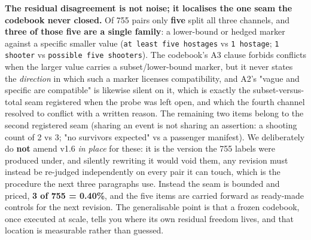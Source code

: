\textbf{The residual disagreement is not noise; it localises the one seam the codebook never closed.} Of 755 pairs only \textbf{five} split all three channels, and \textbf{three of those five are a single family}: a lower-bound or hedged marker against a specific smaller value (\texttt{at least five hostages} vs \texttt{1 hostage}; \texttt{1 shooter} vs \texttt{possible five shooters}). The codebook's A3 clause forbids conflicts when the larger value carries a subset/lower-bound marker, but it never states the \emph{direction} in which such a marker licenses compatibility, and A2's "vague and specific are compatible" is likewise silent on it, which is exactly the subset-versus-total seam registered when the probe was left open, and which the fourth channel resolved to conflict with a written reason. The remaining two items belong to the second registered seam (sharing an event is not sharing an assertion: a shooting count of 2 vs 3; "no survivors expected" vs a passenger manifest). We deliberately do \textbf{not} amend v1.6 \emph{in place} for these: it is the version the 755 labels were produced under, and silently rewriting it would void them, any revision must instead be re-judged independently on every pair it can touch, which is the procedure the next three paragraphs use. Instead the seam is bounded and priced, \textbf{3 of 755 = 0.40\%}, and the five items are carried forward as ready-made controls for the next revision. The generalisable point is that a frozen codebook, once executed at scale, tells you where its own residual freedom lives, and that location is measurable rather than guessed.
